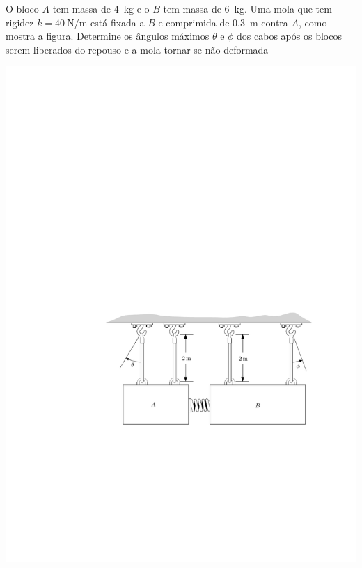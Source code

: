 \item O bloco $A$ tem massa de \SI{4}{\kilogram} e o $B$ tem massa de \SI{6}{\kilogram}. Uma mola que tem rigidez $k=\SI{40}{\newton/\meter}$ está
fixada a $B$ e comprimida de \SI{.3}{\meter} contra $A$, como mostra a figura. Determine os ângulos máximos $\theta$ e $\phi$ dos cabos após os blocos serem liberados do repouso e a mola tornar-se não deformada

\begin{center}
	\includegraphics[scale=1.3]{images/draw_2}
\end{center}
